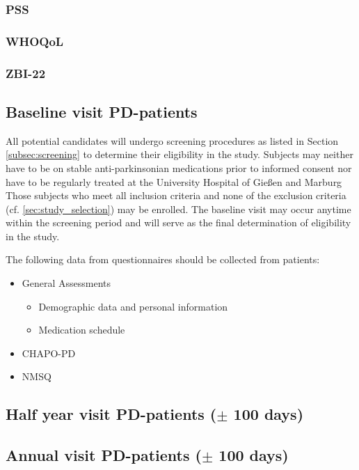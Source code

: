 \documentclass[
	a4paper, 
	11.5pt,
	headings=small, 
	twoside, 
	titlepage=firstiscover, 
 	pagesize=auto,
  	version=last,
	open=any,
	BCOR=14mm,
  	chapterprefix=false]{scrbook}
\newcommand{\UKGM}[1]{University Hospital of Gießen and Marburg}
\begin{document}
\subsubsection{\acl{PSS}}
\subsubsection{\acl{WHOQoL}}
\subsubsection{\acl{ZBI-22}}



\subsection{Baseline visit \ac{PD}-patients}
All potential candidates will undergo screening procedures as listed in Section \ref{subsec:screening} to determine their eligibility in the study. Subjects may neither have to be on stable anti-parkinsonian medications prior to informed consent nor have to be regularly treated at the \UKGM. Those subjects who meet all inclusion criteria and none of the exclusion criteria (cf. \ref{sec:study_selection}) may be enrolled. The baseline visit may occur anytime within the screening period and will serve as the final  determination of eligibility in the study. 

The following data from questionnaires should be collected from patients:
\begin{itemize}
\item General Assessments
\begin{itemize}
\item Demographic data and personal information
\item Medication schedule
\end{itemize}
\item \ac{CHAPO-PD}
\item \ac{NMSQ}
\end{itemize}


\subsection{Half year visit \ac{PD}-patients ($\pm$ 100 days)}

\subsection{Annual visit \ac{PD}-patients ($\pm$ 100 days)}
\end{document}
